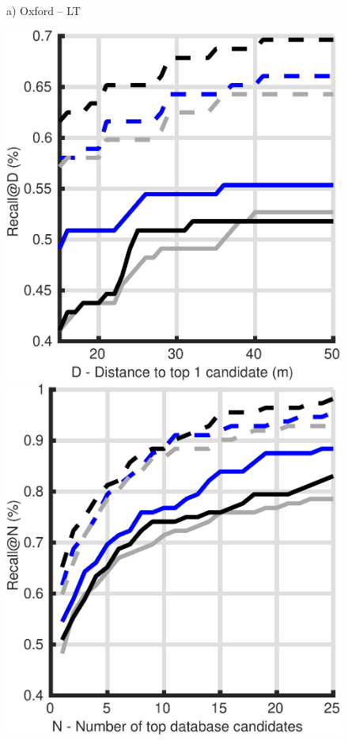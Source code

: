 \begin{figure}
\begin{minipage}{0.19\linewidth}
		a) Oxford -- LT
	\end{minipage}
	\begin{minipage}{0.19\linewidth}
		\center \scriptsize
		\includegraphics[width=\linewidth]{plot/depth_vs_ref/Results_snow_queries/distance}	
		
		\includegraphics[width=\linewidth]{plot/depth_vs_ref/Results_snow_queries/recall}
				

\end{minipage}
\end{figure}
